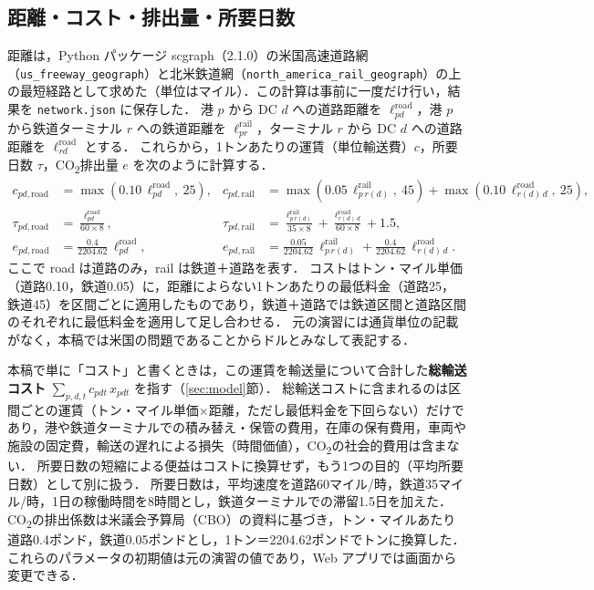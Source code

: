 \documentclass[a4paper,11pt]{ltjsarticle}
\newcommand{\COO}{CO\textsubscript{2}}
\begin{document}
\subsection{距離・コスト・排出量・所要日数}
距離は，Python パッケージ scgraph（2.1.0）の米国高速道路網（\texttt{us\_freeway\_geograph}）と北米鉄道網（\texttt{north\_america\_rail\_geograph}）の上の最短経路として求めた（単位はマイル）．この計算は事前に一度だけ行い，結果を \texttt{network.json} に保存した．
港 $p$ から DC $d$ への道路距離を $\ell^{\mathrm{road}}_{pd}$，港 $p$ から鉄道ターミナル $r$ への鉄道距離を $\ell^{\mathrm{rail}}_{pr}$，ターミナル $r$ から DC $d$ への道路距離を $\ell^{\mathrm{road}}_{rd}$ とする．
これらから，1トンあたりの運賃（単位輸送費）$c$，所要日数 $\tau$，\COO{}排出量 $e$ を次のように計算する．
\begin{align}
c_{pd,\mathrm{road}} &= \max(0.10\,\ell^{\mathrm{road}}_{pd},\ 25), &
c_{pd,\mathrm{rail}} &= \max(0.05\,\ell^{\mathrm{rail}}_{p\,r(d)},\ 45) + \max(0.10\,\ell^{\mathrm{road}}_{r(d)\,d},\ 25), \label{eq:cost}\\
\tau_{pd,\mathrm{road}} &= \frac{\ell^{\mathrm{road}}_{pd}}{60\times 8}, &
\tau_{pd,\mathrm{rail}} &= \frac{\ell^{\mathrm{rail}}_{p\,r(d)}}{35\times 8} + \frac{\ell^{\mathrm{road}}_{r(d)\,d}}{60\times 8} + 1.5, \label{eq:dur}\\
e_{pd,\mathrm{road}} &= \frac{0.4}{2204.62}\,\ell^{\mathrm{road}}_{pd}, &
e_{pd,\mathrm{rail}} &= \frac{0.05}{2204.62}\,\ell^{\mathrm{rail}}_{p\,r(d)} + \frac{0.4}{2204.62}\,\ell^{\mathrm{road}}_{r(d)\,d}. \label{eq:emis}
\end{align}
ここで road は道路のみ，rail は鉄道＋道路を表す．
コストはトン・マイル単価（道路0.10，鉄道0.05）に，距離によらない1トンあたりの最低料金（道路25，鉄道45）を区間ごとに適用したものであり，鉄道＋道路では鉄道区間と道路区間のそれぞれに最低料金を適用して足し合わせる．
元の演習には通貨単位の記載がなく，本稿では米国の問題であることからドルとみなして表記する．

本稿で単に「コスト」と書くときは，この運賃を輸送量について合計した\textbf{総輸送コスト} $\sum_{p,d,t} c_{pdt}\,x_{pdt}$ を指す（\ref{sec:model}節）．
総輸送コストに含まれるのは区間ごとの運賃（トン・マイル単価×距離，ただし最低料金を下回らない）だけであり，港や鉄道ターミナルでの積み替え・保管の費用，在庫の保有費用，車両や施設の固定費，輸送の遅れによる損失（時間価値），\COO{}の社会的費用は含まない．
所要日数の短縮による便益はコストに換算せず，もう1つの目的（平均所要日数）として別に扱う．
所要日数は，平均速度を道路60マイル/時，鉄道35マイル/時，1日の稼働時間を8時間とし，鉄道ターミナルでの滞留1.5日を加えた．
\COO{}の排出係数は米議会予算局（CBO）の資料\cite{cbo2022}に基づき，トン・マイルあたり道路0.4ポンド，鉄道0.05ポンドとし，1トン＝2204.62ポンドでトンに換算した．
これらのパラメータの初期値は元の演習の値であり，Web アプリでは画面から変更できる．
\end{document}
